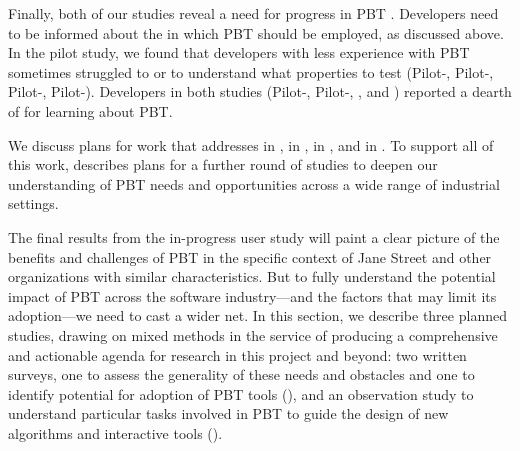 Finally, both of our studies reveal a need for progress
in PBT
. Developers need to be informed about the  in which PBT should be employed, as discussed above.
In the pilot study, we found that developers with less experience with PBT
sometimes struggled to  or to understand what properties to test (Pilot-,
Pilot-,
Pilot-, Pilot-). Developers in both studies
(Pilot-, Pilot-, , and
) reported a dearth of  for
learning about PBT.

We discuss plans for work that addresses  in ,  in
,
   in , and  in .  To support all of this work,
 describes plans for a further round of
studies to deepen our understanding of PBT needs and opportunities
across a wide range of industrial settings.




The final results from the in-progress user study will paint a clear
picture of the benefits and challenges of PBT in the specific context
of Jane Street and other organizations with similar characteristics.  But to
fully understand the potential impact of PBT across the software
industry---and the factors that may limit its adoption---we need to
cast a wider net.
%
In this section, we describe three planned studies, drawing on mixed
methods in the service of producing a comprehensive and actionable
agenda for research in this project and beyond: two
written surveys, one to assess the generality of these needs and obstacles
and one to identify potential for adoption of PBT tools
(), and an observation study to understand
particular tasks involved in PBT to guide the design of new algorithms
and interactive tools ().

